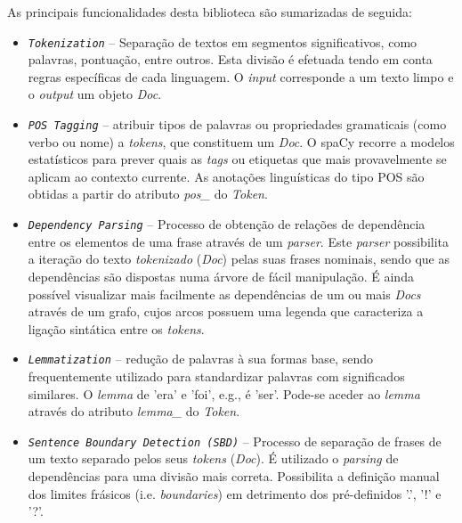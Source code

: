 \documentclass[12pt]{article}
\begin{document}
As principais funcionalidades desta biblioteca são sumarizadas de seguida:
\vspace*{-0.3cm}
\begin{itemize}\itemsep1pt
	\setlength{\itemindent}{+.5cm}	
	\item \texttt{\textit{Tokenization}} -- Separação de textos em segmentos significativos, como palavras, pontuação,  entre outros. Esta divisão é efetuada tendo em conta regras específicas de cada linguagem. O \textit{input} corresponde a um texto limpo e o \textit{output} um objeto \textit{Doc}.
	
	\item \texttt{\textit{POS Tagging}} -- atribuir tipos de palavras ou propriedades gramaticais (como verbo ou nome) a \textit{tokens}, que constituem um \textit{Doc}. O spaCy recorre a modelos estatísticos para prever quais as \textit{tags} ou etiquetas que mais provavelmente se aplicam ao contexto currente. As anotações linguísticas do tipo POS são obtidas a partir do atributo \textit{pos\_} do \textit{Token}.
	
	\item \texttt{\textit{Dependency Parsing}} -- Processo de obtenção de relações de dependência entre os elementos de uma frase através de um \textit{parser}. Este \textit{parser} possibilita a iteração do texto \textit{tokenizado} (\textit{Doc}) pelas suas frases nominais, sendo que as dependências são dispostas numa árvore de fácil manipulação. É ainda possível visualizar mais facilmente as dependências de um ou mais \textit{Docs} através de um grafo, cujos arcos possuem uma legenda que caracteriza a ligação sintática entre os \textit{tokens}. 
	
	\item \texttt{\textit{Lemmatization}} -- redução de palavras à sua formas base, sendo frequentemente utilizado para standardizar palavras com significados similares. O \textit{lemma} de 'era' e 'foi', e.g., é 'ser'. Pode-se aceder ao \textit{lemma} através do atributo \textit{lemma\_} do \textit{Token}.
	
	\item \texttt{\textit{Sentence Boundary Detection (SBD)}} -- Processo de separação de frases de um texto separado pelos seus \textit{tokens} (\textit{Doc}). É utilizado o \textit{parsing} de dependências para uma divisão mais correta. Possibilita a definição manual dos limites frásicos (i.e. \textit{boundaries})
	em detrimento dos pré-definidos '.', '!' e '?'.
	

\end{itemize}
\end{document}
